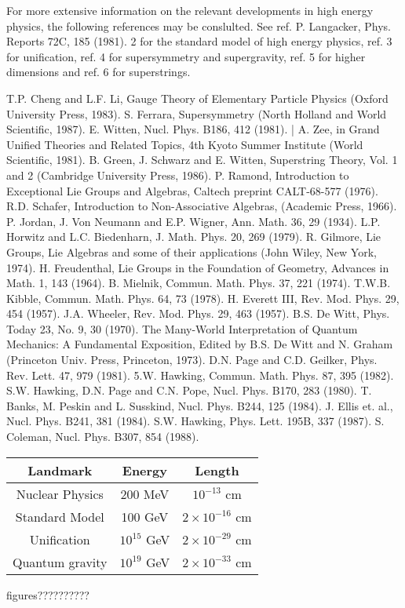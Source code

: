 \begin{thebibliography}{99}
\itemsep=0pt

\bibitem{} For more extensive information on the relevant developments in high energy physics,
the following references may be conslulted. See ref. P. Langacker, Phys. Reports 72C, 185 (1981).  2 for the standard model of high
energy physics, ref. 3 for unification, ref. 4 for supersymmetry and supergravity, ref.
5 for higher dimensions and ref. 6 for superstrings. 

\bibitem{} T.P. Cheng and L.F. Li, Gauge Theory of Elementary Particle Physics (Oxford University Press, 1983). 
\bibitem{} S. Ferrara, Supersymmetry (North Holland and World Scientific, 1987). 
\bibitem{} E. Witten, Nucl. Phys. B186, 412 (1981). |
A. Zee, in Grand Unified Theories and Related Topics, 4th Kyoto Summer Institute
(World Scientific, 1981). 
\bibitem{} B. Green, J. Schwarz and E. Witten, Superstring Theory, Vol. 1 and 2 (Cambridge
University Press, 1986). 
\bibitem{} P. Ramond, Introduction to Exceptional Lie Groups and Algebras, Caltech preprint
CALT-68-577 (1976). 
\bibitem{} R.D. Schafer, Introduction to Non-Associative Algebras, (Academic Press, 1966). 
\bibitem{} P. Jordan, J. Von Neumann and E.P. Wigner, Ann. Math. 36, 29 (1934).
L.P. Horwitz and L.C. Biedenharn, J. Math. Phys. 20, 269 (1979). 
\bibitem{} R. Gilmore, Lie Groups, Lie Algebras and some of their applications (John Wiley,
New York, 1974). 
\bibitem{} H. Freudenthal, Lie Groups in the Foundation of Geometry, Advances in Math. 1,
143 (1964). 
\bibitem{}  B. Mielnik, Commun. Math. Phys. 37, 221 (1974).
T.W.B. Kibble, Commun. Math. Phys. 64, 73 (1978). 
\bibitem{} H. Everett III, Rev. Mod. Phys. 29, 454 (1957).
J.A. Wheeler, Rev. Mod. Phys. 29, 463 (1957).
B.S. De Witt, Phys. Today 23, No. 9, 30 (1970).
The Many-World Interpretation of Quantum Mechanics: A Fundamental Exposition, Edited by B.S. De Witt and N. Graham (Princeton Univ. Press, Princeton,
1973). 
\bibitem{} D.N. Page and C.D. Geilker, Phys. Rev. Lett. 47, 979 (1981). 
\bibitem{} 5.W. Hawking, Commun. Math. Phys. 87, 395 (1982).
S.W. Hawking, D.N. Page and C.N. Pope, Nucl. Phys. B170, 283 (1980).
T. Banks, M. Peskin and L. Susskind, Nucl. Phys. B244, 125 (1984).
J. Ellis et. al., Nucl. Phys. B241, 381 (1984).
S.W. Hawking, Phys. Lett. 195B, 337 (1987). 
\bibitem{} S. Coleman, Nucl. Phys. B307, 854 (1988). 
\end{thebibliography}

\begin{tabular}{|c|c|c|}
\hline
Landmark & Energy & Length\\
\hline
Nuclear Physics & 200 MeV & $10^{-13}$ cm\\
Standard Model & 100 GeV & $2 \times 10^{-16}$ cm\\
Unification & $10^{15}$ GeV & $2 \times 10^{-29}$ cm \\
Quantum gravity & $10^{19}$ GeV & $2 \times 10^{-33}$ cm\\
\hline
\end{tabular}


\vspace{.5cm}

figures??????????
